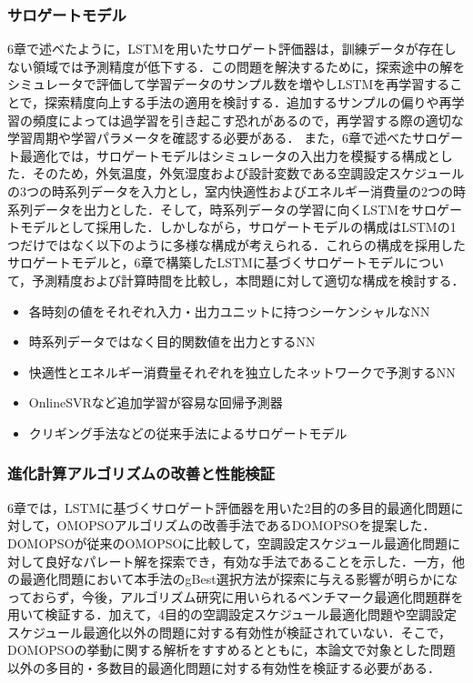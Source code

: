 \subsubsection{サロゲートモデル}
6章で述べたように，LSTMを用いたサロゲート評価器は，訓練データが存在しない領域では予測精度が低下する．この問題を解決するために，探索途中の解をシミュレータで評価して学習データのサンプル数を増やしLSTMを再学習することで，探索精度向上する手法の適用を検討する．追加するサンプルの偏りや再学習の頻度によっては過学習を引き起こす恐れがあるので，再学習する際の適切な学習周期や学習パラメータを確認する必要がある．
また，6章で述べたサロゲート最適化では，サロゲートモデルはシミュレータの入出力を模擬する構成とした．そのため，外気温度，外気湿度および設計変数である空調設定スケジュールの3つの時系列データを入力とし，室内快適性およびエネルギー消費量の2つの時系列データを出力とした．そして，時系列データの学習に向くLSTMをサロゲートモデルとして採用した．しかしながら，サロゲートモデルの構成はLSTMの1つだけではなく以下のように多様な構成が考えられる．これらの構成を採用したサロゲートモデルと，6章で構築したLSTMに基づくサロゲートモデルについて，予測精度および計算時間を比較し，本問題に対して適切な構成を検討する．
\begin{itemize}
    \item 各時刻の値をそれぞれ入力・出力ユニットに持つシーケンシャルなNN
    \item 時系列データではなく目的関数値を出力とするNN
    \item 快適性とエネルギー消費量それぞれを独立したネットワークで予測するNN
    \item OnlineSVRなど追加学習が容易な回帰予測器
    \item クリギング手法などの従来手法によるサロゲートモデル
\end{itemize}

\subsubsection{進化計算アルゴリズムの改善と性能検証}

6章では，LSTMに基づくサロゲート評価器を用いた2目的の多目的最適化問題に対して，OMOPSOアルゴリズムの改善手法であるDOMOPSOを提案した．DOMOPSOが従来のOMOPSOに比較して，空調設定スケジュール最適化問題に対して良好なパレート解を探索でき，有効な手法であることを示した．一方，他の最適化問題において本手法のgBest選択方法が探索に与える影響が明らかになっておらず，今後，アルゴリズム研究に用いられるベンチマーク最適化問題群を用いて検証する．加えて，4目的の空調設定スケジュール最適化問題や空調設定スケジュール最適化以外の問題に対する有効性が検証されていない．そこで，DOMOPSOの挙動に関する解析をすすめるとともに，本論文で対象とした問題以外の多目的・多数目的最適化問題に対する有効性を検証する必要がある．

